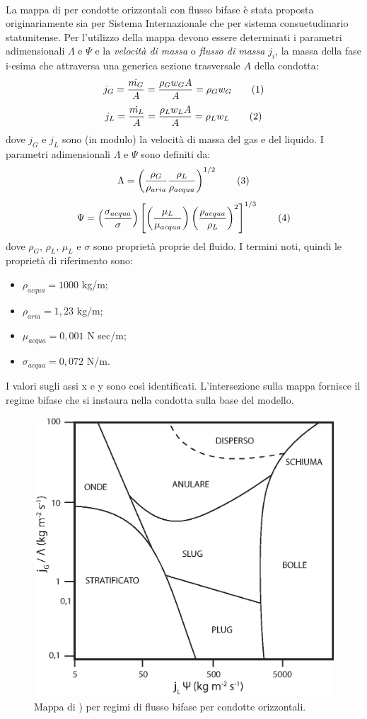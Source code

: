 \paragraph{\textcite{baker1954simultaneous}}
La mappa di \textcite{baker1954simultaneous} per condotte orizzontali con flusso bifase  è stata proposta originariamente sia per Sistema Internazionale che per sistema consuetudinario statunitense. Per l'utilizzo della mappa devono essere determinati i parametri adimensionali \(\Lambda\) e \(\Psi\) e la \textit{velocità di massa} o \textit{flusso di massa} \(j_i\), la massa della fase i-esima che attraversa una generica sezione trasversale \(A\) della condotta:
\[j_G = \frac{\dot{m_G}}{A}=\frac{\rho_G w_G A}{A}=\rho_G w_G \addtag\]
\[j_L = \frac{\dot{m_L}}{A}=\frac{\rho_L w_L A}{A}=\rho_L w_L \addtag\]
dove \(j_G\) e \(j_L\) sono (in modulo) la velocità di massa del gas e del liquido. I parametri adimensionali \(\Lambda\) e \(\Psi\) sono definiti da:
\[\Lambda= \left(\dfrac{\rho_G}{\rho_{aria}} \dfrac{\rho_L}{\rho_{acqua}}\right)^{1/2} \addtag \label{eq:lambdabaker} \]
\[\Psi=\left( \frac{\sigma_{acqua}}{\sigma} \right) \left[ \left( \frac{\mu_L}{\mu_{acqua}} \right) \left( \frac{\rho_{acqua}}{\rho_L} \right)^2 \right]^{1/3} \addtag \]
dove \(\rho_G\), \(\rho_L\), \(\mu_L\) e \(\sigma\) sono proprietà proprie del fluido. I termini noti, quindi le proprietà di riferimento sono:
\begin{itemize}
    \item \(\rho_{acqua}=1000\) kg/m;
    \item \(\rho_{aria}=1,23\) kg/m;
    \item \(\mu_{acqua}=0,001\) N sec/m;
    \item \(\sigma_{acqua}=0,072\) N/m.
\end{itemize}
I valori sugli assi x e y sono così identificati. L'intersezione sulla mappa fornisce il regime bifase che si instaura nella condotta sulla base del modello.
\begin{figure}[htbp]
    \centering
    \includegraphics[width=.6\textwidth]{fig/fluidodinamica/baker.eps}
    \caption{Mappa di \textcite{baker1954simultaneous}) per regimi di flusso bifase per condotte orizzontali.}
    \label{fig:baker}
\end{figure}


